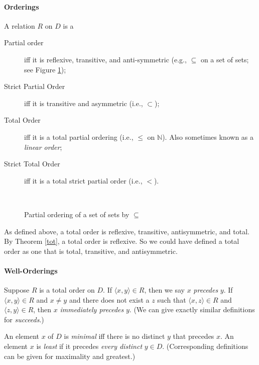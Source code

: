 \paragraph{Orderings}
\begin{definition}[Ordering]\label{def:order}
  A relation $R$ on $D$ is a \begin{description}
    \item [Partial order] iff it is reflexive, transitive, and anti-symmetric (e.g., $\subseteq$ on a set of sets; see Figure \ref{fthree});
    \item [Strict Partial Order] iff it is transitive and asymmetric (i.e., $\subset$);
    \item [Total Order] iff it is a total partial ordering (i.e., $\leqslant$ on $\mathbb{N}$). Also sometimes known as a \emph{linear order};
    \item [Strict Total Order] iff it is a total strict partial order (i.e., $<$).
  \end{description} 
\end{definition}

\begin{figure}
  \centering ~{
  }\caption{Partial ordering of a set of sets by $\subseteq$\label{fthree}}
\end{figure}

As defined above, a total order is reflexive, transitive, antisymmetric, and total. By Theorem \ref{tot}, a total order is reflexive. So we could have defined a total order as one that is total, transitive, and antisymmetric.

\paragraph{Well-Orderings}

Suppose $R$ is a total order on $D$. If $\langle x,y\rangle\in R$, then we say $x$ \emph{precedes} $y$. If $\langle x,y\rangle \in R$ and $x\neq y$ and there does not exist a $z$ such that $\langle x,z\rangle \in R$ and $\langle z,y\rangle \in R$, then $x$ \emph{immediately precedes} $y$. (We can give exactly similar definitions for \emph{succeeds}.)

An element $x$ of $D$ is \emph{minimal} iff there is no distinct $y$ that precedes $x$. An element $x$ is \emph{least} if it precedes \emph{every distinct} $y \in D$. (Corresponding definitions can be given for maximality and greatest.)


